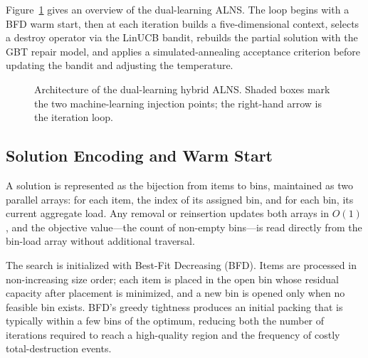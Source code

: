 \documentclass[conference]{IEEEtran}
\begin{document}
Figure~\ref{fig:arch} gives an overview of the dual-learning ALNS. The loop begins with a BFD warm start, then at each iteration builds a five-dimensional context, selects a destroy operator via the LinUCB bandit, rebuilds the partial solution with the GBT repair model, and applies a simulated-annealing acceptance criterion before updating the bandit and adjusting the temperature.

\begin{figure}[H]
	\centering
	\caption{Architecture of the dual-learning hybrid ALNS. Shaded boxes mark the two
		machine-learning injection points; the right-hand arrow is the iteration loop.}
	\label{fig:arch}
\end{figure}

\subsection{Solution Encoding and Warm Start}
A solution is represented as the bijection from items to bins, maintained as
two parallel arrays: for each item, the index of its assigned bin, and for each
bin, its current aggregate load.  Any removal or reinsertion updates both arrays
in $O(1)$, and the objective value---the count of non-empty bins---is read
directly from the bin-load array without additional traversal.

The search is initialized with Best-Fit Decreasing (BFD).  Items are processed
in non-increasing size order; each item is placed in the open bin whose
residual capacity after placement is minimized, and a new bin is opened only
when no feasible bin exists.  BFD's greedy tightness produces an initial packing
that is typically within a few bins of the optimum, reducing both the number of
iterations required to reach a high-quality region and the frequency of costly
total-destruction events.
\end{document}
